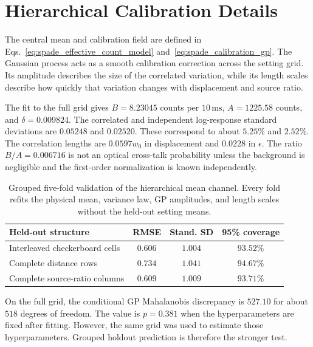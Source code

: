 \section{Hierarchical Calibration Details}

The central mean and calibration field are defined in Eqs.~\eqref{eq:spade_effective_count_model} and~\eqref{eq:spade_calibration_gp}.  The Gaussian process acts as a smooth calibration correction across the setting grid.  Its amplitude describes the size of the correlated variation, while its length scales describe how quickly that variation changes with displacement and source ratio.

The fit to the full grid gives $B=8.23045$ counts per $10\,\mathrm{ms}$, $A=1225.58$ counts, and $\delta=0.009824$.  The correlated and independent log-response standard deviations are $0.05248$ and $0.02520$.  These correspond to about $5.25\%$ and $2.52\%$.  The correlation lengths are $0.0597w_0$ in displacement and $0.0228$ in $\epsilon$.  The ratio $B/A=0.006716$ is not an optical cross-talk probability unless the background is negligible and the first-order normalization is known independently.

\begin{table}[htbp]
    \centering
    \caption{Grouped five-fold validation of the hierarchical mean channel.  Every fold refits the physical mean, variance law, GP amplitudes, and length scales without the held-out setting means.}
    \label{tab:spade_hierarchical_validation}
    \begin{tabularx}{\textwidth}{Xccc}
        \toprule
        \textbf{Held-out structure}    & \textbf{RMSE} & \textbf{Stand. SD} & \textbf{95\% coverage} \\
        \midrule
        Interleaved checkerboard cells & $0.606$       & $1.004$            & $93.52\%$              \\
        Complete distance rows         & $0.734$       & $1.041$            & $94.67\%$              \\
        Complete source-ratio columns  & $0.609$       & $1.009$            & $93.71\%$              \\
        \bottomrule
    \end{tabularx}
\end{table}

On the full grid, the conditional GP Mahalanobis discrepancy is $527.10$ for about $518$ degrees of freedom.  The value is $p=0.381$ when the hyperparameters are fixed after fitting.  However, the same grid was used to estimate those hyperparameters.  Grouped holdout prediction is therefore the stronger test.

